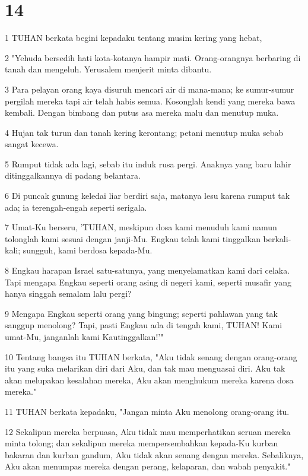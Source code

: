 \chapter{14}

\par 1 TUHAN berkata begini kepadaku tentang musim kering yang hebat,
\par 2 "Yehuda bersedih hati kota-kotanya hampir mati. Orang-orangnya berbaring di tanah dan mengeluh. Yerusalem menjerit minta dibantu.
\par 3 Para pelayan orang kaya disuruh mencari air di mana-mana; ke sumur-sumur pergilah mereka tapi air telah habis semua. Kosonglah kendi yang mereka bawa kembali. Dengan bimbang dan putus asa mereka malu dan menutup muka.
\par 4 Hujan tak turun dan tanah kering kerontang; petani menutup muka sebab sangat kecewa.
\par 5 Rumput tidak ada lagi, sebab itu induk rusa pergi. Anaknya yang baru lahir ditinggalkannya di padang belantara.
\par 6 Di puncak gunung keledai liar berdiri saja, matanya lesu karena rumput tak ada; ia terengah-engah seperti serigala.
\par 7 Umat-Ku berseru, 'TUHAN, meskipun dosa kami menuduh kami namun tolonglah kami sesuai dengan janji-Mu. Engkau telah kami tinggalkan berkali-kali; sungguh, kami berdosa kepada-Mu.
\par 8 Engkau harapan Israel satu-satunya, yang menyelamatkan kami dari celaka. Tapi mengapa Engkau seperti orang asing di negeri kami, seperti musafir yang hanya singgah semalam lalu pergi?
\par 9 Mengapa Engkau seperti orang yang bingung; seperti pahlawan yang tak sanggup menolong? Tapi, pasti Engkau ada di tengah kami, TUHAN! Kami umat-Mu, janganlah kami Kautinggalkan!'"
\par 10 Tentang bangsa itu TUHAN berkata, "Aku tidak senang dengan orang-orang itu yang suka melarikan diri dari Aku, dan tak mau menguasai diri. Aku tak akan melupakan kesalahan mereka, Aku akan menghukum mereka karena dosa mereka."
\par 11 TUHAN berkata kepadaku, "Jangan minta Aku menolong orang-orang itu.
\par 12 Sekalipun mereka berpuasa, Aku tidak mau memperhatikan seruan mereka minta tolong; dan sekalipun mereka mempersembahkan kepada-Ku kurban bakaran dan kurban gandum, Aku tidak akan senang dengan mereka. Sebaliknya, Aku akan menumpas mereka dengan perang, kelaparan, dan wabah penyakit."
